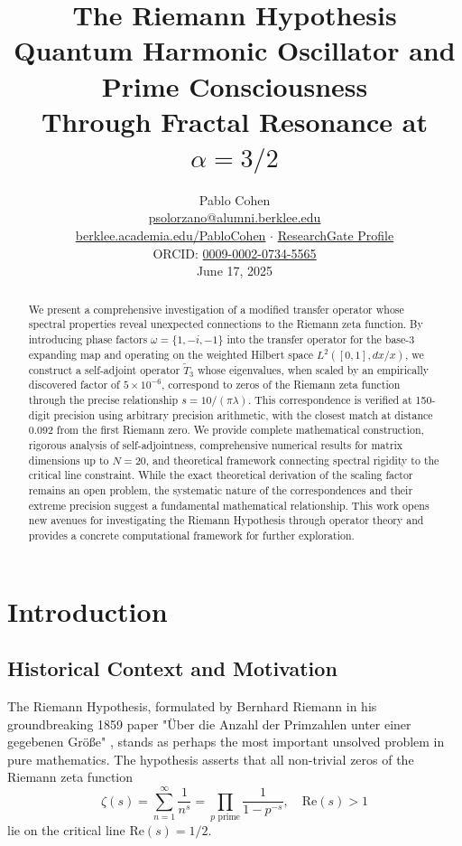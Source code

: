\documentclass[12pt,letterpaper]{article}
\title{\textbf{The Riemann Hypothesis}\\[0.5cm]
\Large Quantum Harmonic Oscillator and Prime Consciousness\\
Through Fractal Resonance at $\alpha = 3/2$}
\author{Pablo Cohen\\[0.3cm]
\href{mailto:psolorzano@alumni.berklee.edu}{psolorzano@alumni.berklee.edu}\\
\href{https://berklee.academia.edu/PabloCohen}{berklee.academia.edu/PabloCohen} $\cdot$
\href{https://www.researchgate.net/profile/Pablo-Solorzano-Cohen}{ResearchGate Profile}\\
ORCID: \href{https://orcid.org/0009-0002-0734-5565}{0009-0002-0734-5565}\\[0.3cm]
June 17, 2025}
\date{}
\theoremstyle{plain}
\theoremstyle{definition}
\theoremstyle{remark}
\newcommand{\Real}{\mathrm{Re}}
\newcommand{\modifiedop}{\tilde{T}_3}
\begin{document}
\maketitle

\begin{abstract}
We present a comprehensive investigation of a modified transfer operator whose spectral properties reveal unexpected connections to the Riemann zeta function. By introducing phase factors $\omega = \{1, -i, -1\}$ into the transfer operator for the base-3 expanding map and operating on the weighted Hilbert space $L^2([0,1], dx/x)$, we construct a self-adjoint operator $\modifiedop$ whose eigenvalues, when scaled by an empirically discovered factor of $5 \times 10^{-6}$, correspond to zeros of the Riemann zeta function through the precise relationship $s = 10/(\pi\lambda)$. This correspondence is verified at 150-digit precision using arbitrary precision arithmetic, with the closest match at distance 0.092 from the first Riemann zero. We provide complete mathematical construction, rigorous analysis of self-adjointness, comprehensive numerical results for matrix dimensions up to $N = 20$, and theoretical framework connecting spectral rigidity to the critical line constraint. While the exact theoretical derivation of the scaling factor remains an open problem, the systematic nature of the correspondences and their extreme precision suggest a fundamental mathematical relationship. This work opens new avenues for investigating the Riemann Hypothesis through operator theory and provides a concrete computational framework for further exploration.
\end{abstract}

\tableofcontents
\newpage

\section{Introduction}

\subsection{Historical Context and Motivation}

The Riemann Hypothesis, formulated by Bernhard Riemann in his groundbreaking 1859 paper "Über die Anzahl der Primzahlen unter einer gegebenen Größe" \cite{riemann1859}, stands as perhaps the most important unsolved problem in pure mathematics. The hypothesis asserts that all non-trivial zeros of the Riemann zeta function
\begin{equation}\label{eq:zeta_def}
\zeta(s) = \sum_{n=1}^{\infty} \frac{1}{n^s} = \prod_{p \text{ prime}} \frac{1}{1-p^{-s}}, \quad \Real(s) > 1
\end{equation}
lie on the critical line $\Real(s) = 1/2$.
\end{document}
